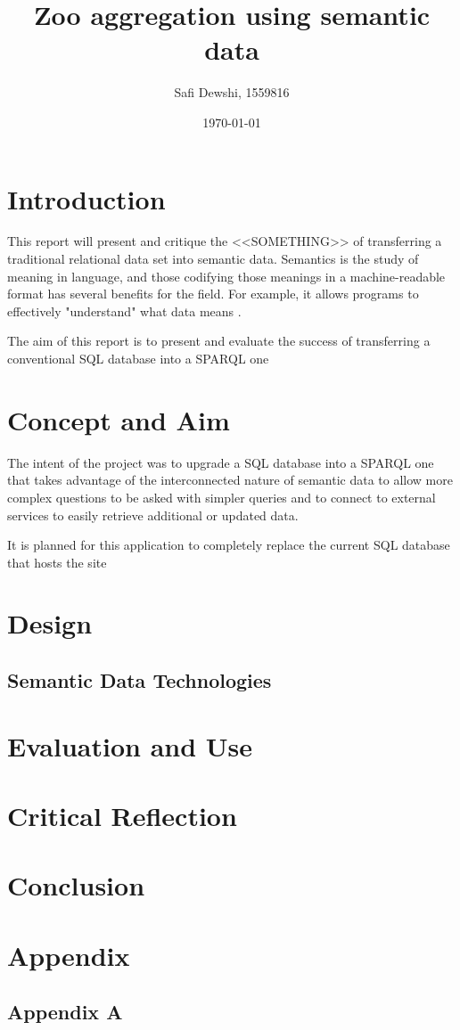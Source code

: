 \documentclass[a4paper]{article}
\author{Safi Dewshi, 1559816}
\title{Zoo aggregation using semantic data}
\date{\today}
\begin{document}
\pagestyle{fancy}
\lhead{}
\maketitle
\pagebreak
\tableofcontents
\pagebreak


\section{Introduction}
This report will present and critique the <<SOMETHING>> of transferring a traditional relational data set into semantic data. Semantics is the study of meaning in language, and those codifying those meanings in a machine-readable format has several benefits for the field. For example, it allows programs to effectively "understand" what data means \autocite{Szeredi2014}.


The aim of this report is to present and evaluate the success of transferring a conventional SQL database into a SPARQL one \autocite{Szeredi2014}



\section{Concept and Aim}
The intent of the project was to upgrade a SQL database into a SPARQL one that takes advantage of the interconnected nature of semantic data to allow more complex questions to be asked with simpler queries and to connect to external services to easily retrieve additional or updated data.
\autocite{Cervo}



It is planned for this application to completely replace the current SQL database that hosts the site


\section{Design}
\subsection{Semantic Data Technologies}

\section{Evaluation and Use}

\section{Critical Reflection}

\section{Conclusion}

\printbibliography

\section*{Appendix}
\subsection*{Appendix A}
\inputminted{python}{main.py}
\end{document}
